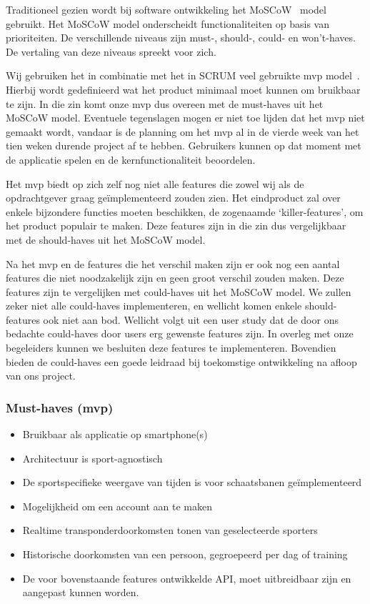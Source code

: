 \newcommand{\programmavaneisen}{}
\label{sec:programma-van-eisen}

Traditioneel gezien wordt bij software ontwikkeling het MoSCoW~\cite{moscow-clegg, moscow} model gebruikt. Het MoSCoW model onderscheidt functionaliteiten op basis van prioriteiten. De verschillende niveaus zijn must-, should-, could- en won't-haves. De vertaling van deze niveaus spreekt voor zich.

Wij gebruiken het in combinatie met het in SCRUM veel gebruikte \acf{mvp} model~\cite{mvp}. Hierbij wordt gedefinieerd wat het product minimaal moet kunnen om bruikbaar te zijn. In die zin komt onze \ac{mvp} dus overeen met de must-haves uit het MoSCoW model. Eventuele tegenslagen mogen er niet toe lijden dat het \ac{mvp} niet gemaakt wordt, vandaar is de planning om het \ac{mvp} al in de vierde week van het tien weken durende project af te hebben. Gebruikers kunnen op dat moment met de applicatie spelen en de kernfunctionaliteit beoordelen.

Het \ac{mvp} biedt op zich zelf nog niet alle features die zowel wij als de opdrachtgever graag geïmplementeerd zouden zien. Het eindproduct zal over enkele bijzondere functies moeten beschikken, de zogenaamde `killer-features', om het product populair te maken. Deze features zijn in die zin dus vergelijkbaar met de should-haves uit het MoSCoW model.

Na het \ac{mvp} en de features die het verschil maken zijn er ook nog een aantal features die niet noodzakelijk zijn en geen groot verschil zouden maken. Deze features zijn te vergelijken met could-haves uit het MoSCoW model. We zullen zeker niet alle could-haves implementeren, en wellicht komen enkele should-features ook niet aan bod. Wellicht volgt uit een user study dat de door ons bedachte could-haves door users erg gewenste features zijn. In overleg met onze begeleiders kunnen we besluiten deze features te implementeren. Bovendien bieden de could-haves een goede leidraad bij toekomstige ontwikkeling na afloop van ons project.

\subsubsection{Must-haves (\ac{mvp})}

\begin{itemize} \parskip0pt 
    \item Bruikbaar als applicatie op smartphone(s)
    \item Architectuur is sport-agnostisch
    \item De sportspecifieke weergave van tijden is voor schaatsbanen geïmplementeerd
    \item Mogelijkheid om een account aan te maken
    \item Realtime transponderdoorkomsten tonen van geselecteerde sporters
    \item Historische doorkomsten van een persoon, gegroepeerd per dag of training
    \item De voor bovenstaande features ontwikkelde API, moet uitbreidbaar zijn en aangepast kunnen worden.
\end{itemize}


